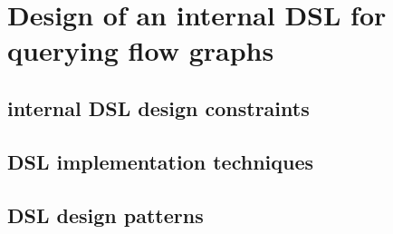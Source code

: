 \section{Design of an internal DSL for querying flow graphs}



\subsection{internal DSL design constraints}

\subsection{DSL implementation techniques}

\subsection{DSL design patterns}

